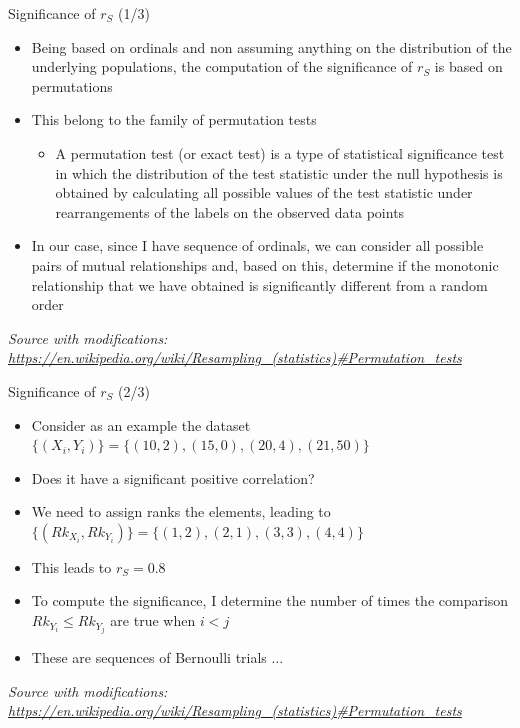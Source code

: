 \documentclass{beamer}
\begin{document}
\begin{frame}
{\centerline{Significance of $r_S$ (1/3)}}

\begin{itemize}
    \item Being based on ordinals and non assuming anything on the distribution of the underlying populations, the computation of the significance of $r_S$ is based on permutations
    \item This belong to the family of permutation tests
    \begin{itemize}
    \item A permutation test (or exact test) is a type of statistical significance test in which the distribution of the test statistic under the null hypothesis is obtained by calculating all possible values of the test statistic under rearrangements of the labels on the observed data points
    \end{itemize}
    \item In our case, since I have sequence of ordinals, we can consider all possible pairs of mutual relationships and, based on this, determine if the monotonic relationship that we have obtained is significantly different from a random order
    
\end{itemize}

\textit{\tiny
\vspace{-\baselineskip}
Source with modifications: \url{https://en.wikipedia.org/wiki/Resampling_(statistics)\#Permutation_tests}}
\end{frame}

\begin{frame}
{\centerline{Significance of $r_S$ (2/3)}}

\begin{itemize}
    \item Consider as an example the dataset $\{(X_i,Y_i)\} = \{(10,2), (15, 0), (20, 4), (21,50)\}$
    \item Does it have a significant positive correlation?
    \item We need to assign ranks the elements, leading to $\{(Rk_{X_i},Rk_{Y_i})\} = \{(1,2), (2, 1), (3, 3), (4,4)\}$
    \item This leads to $r_S = 0.8$
    \item To compute the significance, I determine the number of times the comparison $Rk_{Y_i} \leq Rk_{Y_j}$ are true when $i<j$
    \item These are sequences of Bernoulli trials $\ldots$
    
\end{itemize}

\textit{\tiny
\vspace{-\baselineskip}
Source with modifications: \url{https://en.wikipedia.org/wiki/Resampling_(statistics)\#Permutation_tests}}
\end{frame}
\end{document}

